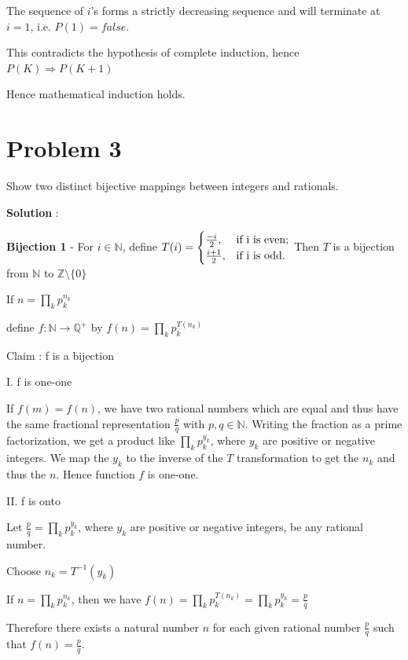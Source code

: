 \documentclass{article}
\begin{document}
    \quad The sequence of $i$’s forms a strictly decreasing sequence and will terminate at $i = 1$, i.e. $P(1) = false$.

    \quad This contradicts the hypothesis of complete induction, hence $P(K) \Longrightarrow P(K + 1)$
    
    \quad Hence mathematical induction holds.
    
    \section*{Problem 3} Show two distinct bijective mappings between integers and rationals.
    
    \textbf{Solution} : 
    
\quad \textbf{Bijection 1} - For $i \in \mathbb{N}$, define $T(i)=\begin{cases}
                \frac{-i}{2}, & \hbox{if i is even;} \\
                \frac{i+1}{2}, & \hbox{if i is odd.}
            \end{cases}$
     Then $T$ is a bijection from $\mathbb{N}$ to $\mathbb{Z}\setminus\{0\}$

    \quad If $n = \prod_{k}p_k^{n_k}$
    
    \quad define $f: \mathbb{N}\rightarrow \mathbb{Q^+}$ by $f(n)=\prod_{k}p_k^{T(n_k)}$
    
    \quad Claim : f is a bijection
    
    \quad I. f is one-one
    
    \qquad If $f(m) = f(n)$, we have two rational numbers which are equal and thus have the same fractional representation $\frac{p}{q}$ with $p,q \in \mathbb{N}$. Writing the fraction as a prime factorization, we get a product like $\prod_{k}p_k^{y_k}$, where $y_k$ are positive or negative integers. We map the $y_k$ to the inverse of the $T$ transformation to get the $n_k$ and thus the $n$. Hence function $f$ is one-one.
    
    \quad II. f is onto
    
    \qquad Let $\frac{p}{q}=\prod_{k}p_k^{y_k}$, where $y_k$ are positive or negative integers, be any rational number. 
    
    \qquad Choose $n_k = T^{-1}(y_k)$ 
    
    \qquad If $n=\prod_{k}p_k^{n_k}$, then we have $f(n)=\prod_{k}p_k^{T(n_k)}=\prod_{k}p_k^{y_k}=\frac{p}{q}$ 
    
    \qquad Therefore there exists a natural number $n$ for each given rational number $\frac{p}{q}$ such that $f(n)=\frac{p}{q}$. 
    
\end{document}
